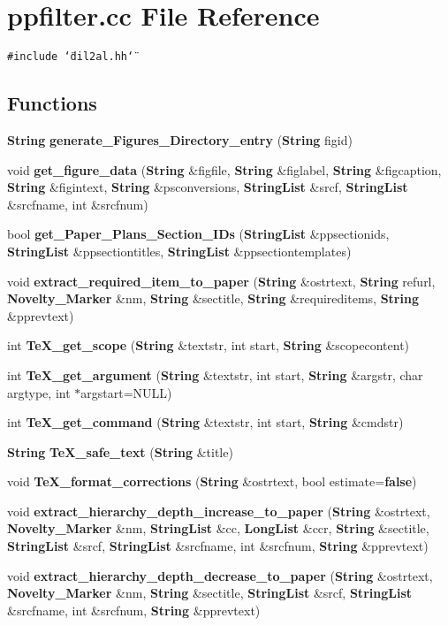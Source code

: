\section{ppfilter.cc File Reference}
\label{ppfilter_8cc}
{\tt \#include \char`\"{}dil2al.hh\char`\"{}}\par
\subsection*{Functions}
\begin{CompactItemize}
\item 
{\bf String} {\bf generate\_\-Figures\_\-Directory\_\-entry} ({\bf String} figid)
\item 
void {\bf get\_\-figure\_\-data} ({\bf String} \&figfile, {\bf String} \&figlabel, {\bf String} \&figcaption, {\bf String} \&figintext, {\bf String} \&psconversions, {\bf String\-List} \&srcf, {\bf String\-List} \&srcfname, int \&srcfnum)
\item 
bool {\bf get\_\-Paper\_\-Plans\_\-Section\_\-IDs} ({\bf String\-List} \&ppsectionids, {\bf String\-List} \&ppsectiontitles, {\bf String\-List} \&ppsectiontemplates)
\item 
void {\bf extract\_\-required\_\-item\_\-to\_\-paper} ({\bf String} \&ostrtext, {\bf String} refurl, {\bf Novelty\_\-Marker} \&nm, {\bf String} \&sectitle, {\bf String} \&requireditems, {\bf String} \&pprevtext)
\item 
int {\bf Te\-X\_\-get\_\-scope} ({\bf String} \&textstr, int start, {\bf String} \&scopecontent)
\item 
int {\bf Te\-X\_\-get\_\-argument} ({\bf String} \&textstr, int start, {\bf String} \&argstr, char argtype, int $\ast$argstart=NULL)
\item 
int {\bf Te\-X\_\-get\_\-command} ({\bf String} \&textstr, int start, {\bf String} \&cmdstr)
\item 
{\bf String} {\bf Te\-X\_\-safe\_\-text} ({\bf String} \&title)
\item 
void {\bf Te\-X\_\-format\_\-corrections} ({\bf String} \&ostrtext, bool estimate={\bf false})
\item 
void {\bf extract\_\-hierarchy\_\-depth\_\-increase\_\-to\_\-paper} ({\bf String} \&ostrtext, {\bf Novelty\_\-Marker} \&nm, {\bf String\-List} \&cc, {\bf Long\-List} \&ccr, {\bf String} \&sectitle, {\bf String\-List} \&srcf, {\bf String\-List} \&srcfname, int \&srcfnum, {\bf String} \&pprevtext)
\item 
void {\bf extract\_\-hierarchy\_\-depth\_\-decrease\_\-to\_\-paper} ({\bf String} \&ostrtext, {\bf Novelty\_\-Marker} \&nm, {\bf String} \&sectitle, {\bf String\-List} \&srcf, {\bf String\-List} \&srcfname, int \&srcfnum, {\bf String} \&pprevtext)

\end{CompactItemize}
